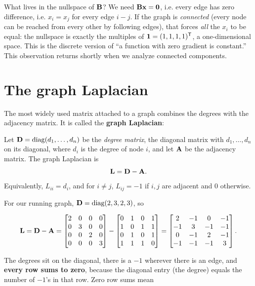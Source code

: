 What lives in the nullspace of $\mathbf{B}$? We need $\mathbf{B}\mathbf{x} = \mathbf{0}$, i.e. every
edge has zero difference, i.e. $x_i = x_j$ for every edge $i\!-\!j$. If the graph is
\emph{connected} (every node can be reached from every other by following edges), that forces \emph{all} the $x_i$ to be equal: the nullspace is exactly the
multiples of $\mathbf{1} = (1,1,1,1)^{\mathsf{T}}$, a one-dimensional space. This is the discrete version
of ``a function with zero gradient is constant.'' This observation returns shortly
when we analyze connected components.

\section{The graph Laplacian}
\label{ch35:laplacian}

The most widely used matrix attached to a graph combines the degrees with the adjacency
matrix. It is called the \textbf{graph Laplacian}:

\begin{definition}
\label{ch35:def-laplacian}
Let $\mathbf{D} = \operatorname{diag}(d_1,\dots,d_n)$ be the \emph{degree matrix}, the diagonal matrix with
$d_1,\dots,d_n$ on its diagonal, where $d_i$ is the degree of node $i$, and let $\mathbf{A}$ be the adjacency matrix. The graph Laplacian is
\[
\mathbf{L} = \mathbf{D} - \mathbf{A}.
\]
Equivalently, $L_{ii} = d_i$, and for $i \ne j$, $L_{ij} = -1$ if $i,j$ are adjacent and
$0$ otherwise.
\end{definition}

For our running graph, $\mathbf{D} = \operatorname{diag}(2,3,2,3)$, so

\[
\mathbf{L} = \mathbf{D} - \mathbf{A} =
\begin{bmatrix}2&0&0&0\\0&3&0&0\\0&0&2&0\\0&0&0&3\end{bmatrix}
-
\begin{bmatrix}0&1&0&1\\1&0&1&1\\0&1&0&1\\1&1&1&0\end{bmatrix}
=
\begin{bmatrix}
2 & -1 & 0 & -1\\
-1 & 3 & -1 & -1\\
0 & -1 & 2 & -1\\
-1 & -1 & -1 & 3
\end{bmatrix}.
\]

The degrees sit on the diagonal, there is a $-1$ wherever there is an edge, and
\textbf{every row sums to zero}, because the diagonal entry (the degree) equals the number
of $-1$'s in that row. Zero row sums mean

